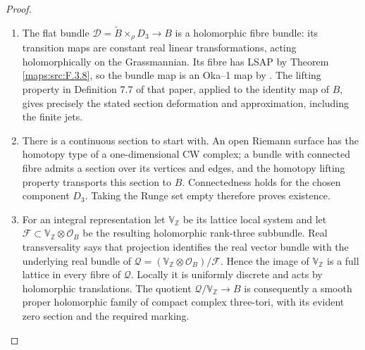 \begin{proof}
\begin{enumerate}[label={$\langle1\rangle$\arabic*.}]
\item The flat bundle
$\mathscr D=\widetilde B\times_\rho D_3\to B$ is a holomorphic
fibre bundle: its transition maps are constant real linear
transformations, acting holomorphically on the Grassmannian.
Its fibre has LSAP by Theorem \ref{maps:src:F.3.8}, so the bundle map is an
Oka--1 map by \cite[Proposition 7.13(d), p.~24]{IVVOkaOneV5}.
The lifting property in Definition 7.7 of that paper, applied
to the identity map of $B$, gives precisely the stated section
deformation and approximation, including the finite jets.


\item There is a continuous section to start with.  An open Riemann
surface has the homotopy type of a one-dimensional CW complex;
a bundle with connected fibre admits a section over its vertices
and edges, and the homotopy lifting property transports this
section to $B$.  Connectedness holds for the chosen component
$D_3$.  Taking the Runge set empty therefore proves existence.

\item For an integral representation let $\mathbb V_\mathbb Z$ be its
lattice local system and let $\mathcal F\subset
\mathbb V_\mathbb Z\otimes\mathcal O_B$ be the resulting
holomorphic rank-three subbundle.  Real transversality says that
projection identifies the real vector bundle with the underlying
real bundle of
$\mathcal Q=(\mathbb V_\mathbb Z\otimes\mathcal O_B)/\mathcal F$.
Hence the image of $\mathbb V_\mathbb Z$ is a full lattice in
every fibre of $\mathcal Q$.  Locally it is uniformly discrete
and acts by holomorphic translations.  The quotient
$\mathcal Q/\mathbb V_\mathbb Z\to B$ is consequently a smooth
proper holomorphic family of compact complex three-tori,
with its evident zero section and the required marking.

\end{enumerate}
\end{proof}




